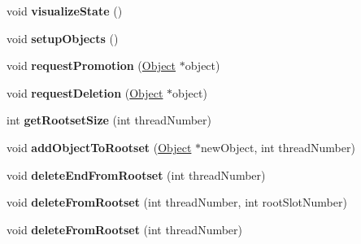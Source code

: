 \begin{DoxyCompactItemize}
\item 
\hypertarget{classtrace_gen_1_1_memory_manager_a94f39a1dcf733d2d8d3a69931a9d685b}{}void {\bfseries visualize\+State} ()\label{classtrace_gen_1_1_memory_manager_a94f39a1dcf733d2d8d3a69931a9d685b}

\item 
\hypertarget{classtrace_gen_1_1_memory_manager_a7133b454499a7bea6453efd5b14fb2b0}{}void {\bfseries setup\+Objects} ()\label{classtrace_gen_1_1_memory_manager_a7133b454499a7bea6453efd5b14fb2b0}

\item 
\hypertarget{classtrace_gen_1_1_memory_manager_a344d7550615dec19d32302a5e73d3697}{}void {\bfseries request\+Promotion} (\hyperlink{classtrace_gen_1_1_object}{Object} $\ast$object)\label{classtrace_gen_1_1_memory_manager_a344d7550615dec19d32302a5e73d3697}

\item 
\hypertarget{classtrace_gen_1_1_memory_manager_a28725c2835c1d5524a71ca2d95e8bd26}{}void {\bfseries request\+Deletion} (\hyperlink{classtrace_gen_1_1_object}{Object} $\ast$object)\label{classtrace_gen_1_1_memory_manager_a28725c2835c1d5524a71ca2d95e8bd26}

\item 
\hypertarget{classtrace_gen_1_1_memory_manager_adb54f8436e9b7e76316adba47f50690c}{}int {\bfseries get\+Rootset\+Size} (int thread\+Number)\label{classtrace_gen_1_1_memory_manager_adb54f8436e9b7e76316adba47f50690c}

\item 
\hypertarget{classtrace_gen_1_1_memory_manager_a02e8b84d48359226f6c669b6f8d104b3}{}void {\bfseries add\+Object\+To\+Rootset} (\hyperlink{classtrace_gen_1_1_object}{Object} $\ast$new\+Object, int thread\+Number)\label{classtrace_gen_1_1_memory_manager_a02e8b84d48359226f6c669b6f8d104b3}

\item 
\hypertarget{classtrace_gen_1_1_memory_manager_ae4bb523090cc3bbb3b89767b1fb3c865}{}void {\bfseries delete\+End\+From\+Rootset} (int thread\+Number)\label{classtrace_gen_1_1_memory_manager_ae4bb523090cc3bbb3b89767b1fb3c865}

\item 
\hypertarget{classtrace_gen_1_1_memory_manager_af7a816f6d5f15b44ec7179229d081f3c}{}void {\bfseries delete\+From\+Rootset} (int thread\+Number, int root\+Slot\+Number)\label{classtrace_gen_1_1_memory_manager_af7a816f6d5f15b44ec7179229d081f3c}

\item 
\hypertarget{classtrace_gen_1_1_memory_manager_ad4c8bfeac320f1f1f7dc29139b47c485}{}void {\bfseries delete\+From\+Rootset} (int thread\+Number)\label{classtrace_gen_1_1_memory_manager_ad4c8bfeac320f1f1f7dc29139b47c485}


\end{DoxyCompactItemize}
